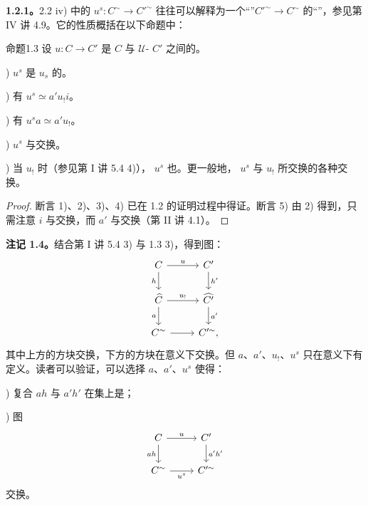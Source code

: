 \textbf{1.2.1。}2.2 iv) 中的 $u^s:C^{\sim}\to C'^{\sim}$ 往往可以解释为一个“”$C'^{\sim}\to C^{\sim}$ 的“”，参见第 IV 讲 4.9。它的性质概括在以下命题中：
\begin{SGAresult}{命题}{1.3}
设 $u:C\to C'$ 是 $C$ 与 $\mathcal U$- $C'$ 之间的。

)  $u^s$ 是 $u_s$ 的。

) 有 $u^s\simeq a'u_!i$。

) 有 $u^sa\simeq a'u_!$。

)  $u^s$ 与交换。

) 当 $u_!$ 时（参见第 I 讲 5.4 4)）， $u^s$ 也。更一般地， $u^s$ 与 $u_!$ 所交换的各种交换。
\end{SGAresult}
\begin{proof}
断言 1)、2)、3)、4) 已在 1.2 的证明过程中得证。断言 5) 由 2) 得到，只需注意 $i$ 与交换，而 $a'$ 与交换（第 II 讲 4.1）。
\end{proof}

\textbf{注记 1.4。}结合第 I 讲 5.4 3) 与 1.3 3)，得到图：
\[
\begin{tikzcd}
 C\arrow[r,"u"]\arrow[d,"h"']&C'\arrow[d,"h'"]\\
 \widehat C\arrow[r,"u_!"]\arrow[d,"a"']&\widehat {C'}\arrow[d,"a'"]\\
 C^{\sim}\arrow[r]&C'^{\sim},
\end{tikzcd}
\]
其中上方的方块交换，下方的方块在意义下交换。但 $a$、$a'$、$u_!$、$u^s$ 只在意义下有定义。读者可以验证，可以选择 $a$、$a'$、$u^s$ 使得：

) 复合 $ah$ 与 $a'h'$ 在集上是；

) 图
\[
\begin{tikzcd}
 C\arrow[r,"u"]\arrow[d,"ah"']&C'\arrow[d,"a'h'"]\\
 C^{\sim}\arrow[r,"u^s"']&C'^{\sim}
\end{tikzcd}
\]
交换。

